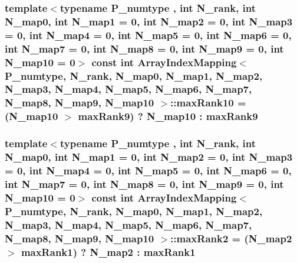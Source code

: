 \subsubsection[{max\+Rank10}]{\setlength{\rightskip}{0pt plus 5cm}template$<$typename P\+\_\+numtype , int N\+\_\+rank, int N\+\_\+map0, int N\+\_\+map1 = 0, int N\+\_\+map2 = 0, int N\+\_\+map3 = 0, int N\+\_\+map4 = 0, int N\+\_\+map5 = 0, int N\+\_\+map6 = 0, int N\+\_\+map7 = 0, int N\+\_\+map8 = 0, int N\+\_\+map9 = 0, int N\+\_\+map10 = 0$>$ const int {\bf Array\+Index\+Mapping}$<$ P\+\_\+numtype, N\+\_\+rank, N\+\_\+map0, N\+\_\+map1, N\+\_\+map2, N\+\_\+map3, N\+\_\+map4, N\+\_\+map5, N\+\_\+map6, N\+\_\+map7, N\+\_\+map8, N\+\_\+map9, N\+\_\+map10 $>$\+::max\+Rank10 = (N\+\_\+map10 $>$ {\bf max\+Rank9}) ? N\+\_\+map10 \+: {\bf max\+Rank9}\hspace{0.3cm}{\ttfamily [static]}}\label{classArrayIndexMapping_a68ee816f5bdc86f1ab68826121af4362}
\hypertarget{classArrayIndexMapping_a5966d8b9bfafddd6f4541b45548d7620}{}
\subsubsection[{max\+Rank2}]{\setlength{\rightskip}{0pt plus 5cm}template$<$typename P\+\_\+numtype , int N\+\_\+rank, int N\+\_\+map0, int N\+\_\+map1 = 0, int N\+\_\+map2 = 0, int N\+\_\+map3 = 0, int N\+\_\+map4 = 0, int N\+\_\+map5 = 0, int N\+\_\+map6 = 0, int N\+\_\+map7 = 0, int N\+\_\+map8 = 0, int N\+\_\+map9 = 0, int N\+\_\+map10 = 0$>$ const int {\bf Array\+Index\+Mapping}$<$ P\+\_\+numtype, N\+\_\+rank, N\+\_\+map0, N\+\_\+map1, N\+\_\+map2, N\+\_\+map3, N\+\_\+map4, N\+\_\+map5, N\+\_\+map6, N\+\_\+map7, N\+\_\+map8, N\+\_\+map9, N\+\_\+map10 $>$\+::max\+Rank2 = (N\+\_\+map2 $>$ {\bf max\+Rank1}) ? N\+\_\+map2 \+: {\bf max\+Rank1}\hspace{0.3cm}{\ttfamily [static]}}\label{classArrayIndexMapping_a5966d8b9bfafddd6f4541b45548d7620}
\hypertarget{classArrayIndexMapping_ae8774956b8f4a23da006bca9db0ffbbf}{}
